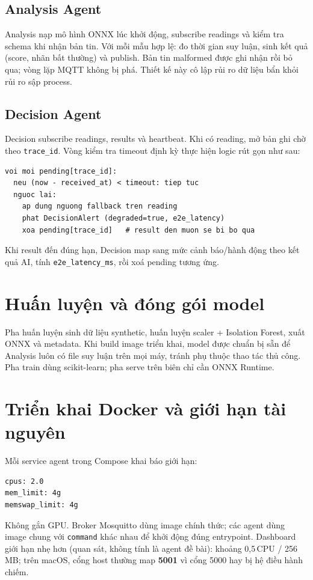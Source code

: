 \documentclass[12pt,a4paper,oneside]{report}
\newcommand{\code}[1]{\texttt{#1}}
\begin{document}
\subsection{Analysis Agent}
Analysis nạp mô hình ONNX lúc khởi động, subscribe readings và kiểm tra schema khi nhận bản tin. Với mỗi mẫu hợp lệ: đo thời gian suy luận, sinh kết quả (score, nhãn bất thường) và publish. Bản tin malformed được ghi nhận rồi bỏ qua; vòng lặp MQTT không bị phá. Thiết kế này cô lập rủi ro dữ liệu bẩn khỏi rủi ro sập process.

\subsection{Decision Agent}
Decision subscribe readings, results và heartbeat. Khi có reading, mở bản ghi chờ theo \code{trace\_id}. Vòng kiểm tra timeout định kỳ thực hiện logic rút gọn như sau:

\begin{lstlisting}[caption={Gia ma --- timeout va fallback tai Decision},label=lst:timeout]
voi moi pending[trace_id]:
  neu (now - received_at) < timeout: tiep tuc
  nguoc lai:
    ap dung nguong fallback tren reading
    phat DecisionAlert (degraded=true, e2e_latency)
    xoa pending[trace_id]   # result den muon se bi bo qua
\end{lstlisting}

Khi result đến đúng hạn, Decision map sang mức cảnh báo/hành động theo kết quả AI, tính \code{e2e\_latency\_ms}, rồi xoá pending tương ứng.

\section{Huấn luyện và đóng gói model}

Pha huấn luyện sinh dữ liệu synthetic, huấn luyện scaler + Isolation Forest, xuất ONNX và metadata. Khi build image triển khai, model được chuẩn bị sẵn để Analysis luôn có file suy luận trên mọi máy, tránh phụ thuộc thao tác thủ công. Pha train dùng scikit-learn; pha serve trên biên chỉ cần ONNX Runtime.

\section{Triển khai Docker và giới hạn tài nguyên}

Mỗi service agent trong Compose khai báo giới hạn:
\begin{lstlisting}[caption={Gioi han tai nguyen moi agent}]
cpus: 2.0
mem_limit: 4g
memswap_limit: 4g
\end{lstlisting}
Không gắn GPU. Broker Mosquitto dùng image chính thức; các agent dùng image chung với \code{command} khác nhau để khởi động đúng entrypoint. Dashboard giới hạn nhẹ hơn (quan sát, không tính là agent đề bài): khoảng 0,5\,CPU / 256\,MB; trên macOS, cổng host thường map \textbf{5001} vì cổng 5000 hay bị hệ điều hành chiếm.
\end{document}
